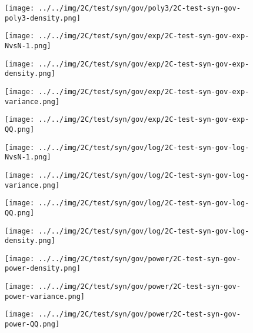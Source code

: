 \begin{figure}[H]
\centering	\texttt{[image: ../../img/2C/test/syn/gov/poly3/2C-test-syn-gov-poly3-density.png]}
\end{figure}
\begin{figure}[H]
\centering	\texttt{[image: ../../img/2C/test/syn/gov/exp/2C-test-syn-gov-exp-NvsN-1.png]}
\end{figure}
\begin{figure}[H]
\centering	\texttt{[image: ../../img/2C/test/syn/gov/exp/2C-test-syn-gov-exp-density.png]}
\end{figure}
\begin{figure}[H]
\centering	\texttt{[image: ../../img/2C/test/syn/gov/exp/2C-test-syn-gov-exp-variance.png]}
\end{figure}
\begin{figure}[H]
\centering	\texttt{[image: ../../img/2C/test/syn/gov/exp/2C-test-syn-gov-exp-QQ.png]}
\end{figure}
\begin{figure}[H]
\centering	\texttt{[image: ../../img/2C/test/syn/gov/log/2C-test-syn-gov-log-NvsN-1.png]}
\end{figure}
\begin{figure}[H]
\centering	\texttt{[image: ../../img/2C/test/syn/gov/log/2C-test-syn-gov-log-variance.png]}
\end{figure}
\begin{figure}[H]
\centering	\texttt{[image: ../../img/2C/test/syn/gov/log/2C-test-syn-gov-log-QQ.png]}
\end{figure}
\begin{figure}[H]
\centering	\texttt{[image: ../../img/2C/test/syn/gov/log/2C-test-syn-gov-log-density.png]}
\end{figure}
\begin{figure}[H]
\centering	\texttt{[image: ../../img/2C/test/syn/gov/power/2C-test-syn-gov-power-density.png]}
\end{figure}
\begin{figure}[H]
\centering	\texttt{[image: ../../img/2C/test/syn/gov/power/2C-test-syn-gov-power-variance.png]}
\end{figure}
\begin{figure}[H]
\centering	\texttt{[image: ../../img/2C/test/syn/gov/power/2C-test-syn-gov-power-QQ.png]}
\end{figure}
